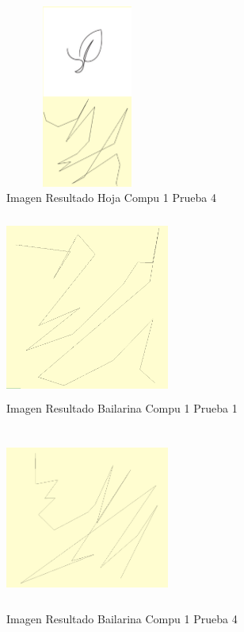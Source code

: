 \documentclass[conference]{IEEEtran}
\begin{document}
\begin{figure}[h]
    \centering
    \includegraphics[width=0.480\textwidth, height=6cm]{1 hoja compu1 .png} 
    \caption{Imagen Resultado Hoja Compu 1 Prueba 4}
    \label{fig:mi_imagen}
\end{figure}

\begin{figure}[h]
    \centering
    \includegraphics[width=0.480\textwidth, height=6cm]{prueba 1 compu 1 bailarina.png} 
    \caption{Imagen Resultado Bailarina Compu 1 Prueba 1}
    \label{fig:mi_imagen}
\end{figure}

\begin{figure}[h]
    \centering
    \includegraphics[width=0.480\textwidth, height=6cm]{bailarina compu 1 prueba 4.png} 
    \caption{Imagen Resultado Bailarina Compu 1 Prueba 4}
    \label{fig:mi_imagen}
\end{figure}
\end{document}
